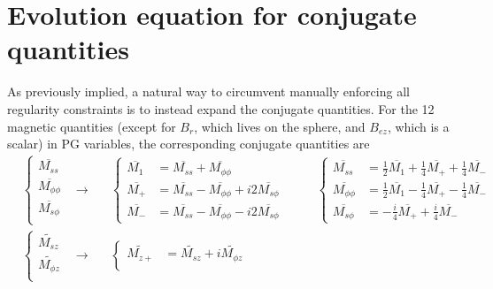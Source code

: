 \section{Evolution equation for conjugate quantities}

As previously implied, a natural way to circumvent manually enforcing all regularity constraints is to instead expand the conjugate quantities.
For the 12 magnetic quantities (except for $B_r$, which lives on the sphere, and $B_{ez}$, which is a scalar) in PG variables, the corresponding conjugate quantities are
\begin{equation}\label{eqn:conjugate-transform}
\begin{aligned}
    &\left\{\begin{aligned}
        \overline{M_{ss}} \\ 
        \overline{M_{\phi\phi}} \\ 
        \overline{M_{s\phi}} \\ 
    \end{aligned}\right. &\longrightarrow \quad 
    &\left\{\begin{aligned}
        \overline{M_1} &= \overline{M_{ss}} + \overline{M_{\phi\phi}} \\ 
        \overline{M_+} &= \overline{M_{ss}} - \overline{M_{\phi\phi}} + i2 \overline{M_{s\phi}} \\ 
        \overline{M_-} &= \overline{M_{ss}} - \overline{M_{\phi\phi}} - i2 \overline{M_{s\phi}}
    \end{aligned}\right. &\quad
    &\left\{\begin{aligned}
        \overline{M_{ss}} &= \frac{1}{2} \overline{M_1} + \frac{1}{4}\overline{M_+} + \frac{1}{4}\overline{M_-} \\ 
        \overline{M_{\phi\phi}} &= \frac{1}{2}\overline{M_1} - \frac{1}{4} \overline{M_+} - \frac{1}{4} \overline{M_-} \\ 
        \overline{M_{s\phi}} &= -\frac{i}{4}\overline{M_+} + \frac{i}{4} \overline{M_-}
    \end{aligned}\right. \\ 
    &\left\{\begin{aligned}
        \widetilde{M_{sz}} \\ 
        \widetilde{M_{\phi z}} \\ 
    \end{aligned}\right. &\longrightarrow \quad 
    &\left\{\begin{aligned}
        \widetilde{M_{z+}} &= \widetilde{M_{sz}} + i\widetilde{M_{\phi z}} \\ 

\end{aligned}
\end{aligned}
\end{equation}
